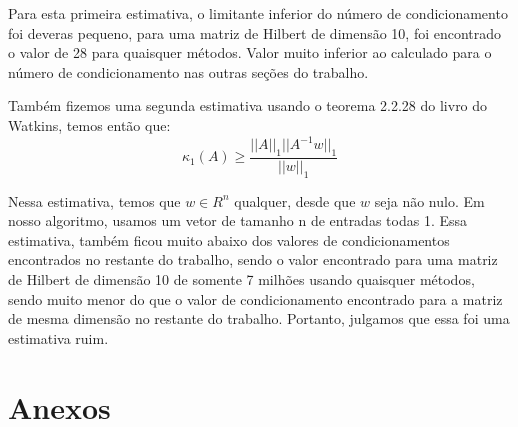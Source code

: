 \documentclass[12pt, a4paper]{article}
\begin{document}
Para esta primeira estimativa, o limitante inferior do número de condicionamento foi deveras pequeno, para uma matriz de Hilbert de dimensão 10, foi encontrado o valor de 28 para quaisquer métodos. Valor muito inferior ao calculado para o número de condicionamento nas outras seções do trabalho.


Também fizemos uma segunda estimativa usando o teorema 2.2.28 do livro do Watkins, temos então que:
\begin{equation}
    \kappa_1(A) \geq \frac{||A||_1 ||A^{-1}w||_1}{||w||_1}
\end{equation}

Nessa estimativa, temos que $w \in R^{n}$ qualquer, desde que $w$ seja não nulo. Em nosso algoritmo, usamos um vetor de tamanho n de entradas todas 1.
Essa estimativa, também ficou muito abaixo dos valores de condicionamentos encontrados no restante do trabalho, sendo o valor encontrado para uma matriz de Hilbert de dimensão 10 de somente 7 milhões usando quaisquer métodos, sendo muito menor do que o valor de condicionamento encontrado para a matriz de mesma dimensão no restante do trabalho. Portanto, julgamos que essa foi uma estimativa ruim.
\printbibliography
\nocite{watkins2004fundamentals}
\nocite{lopes1996calculo}
\nocite{strang1993introduction}

\newpage
\section{Anexos}
\end{document}
